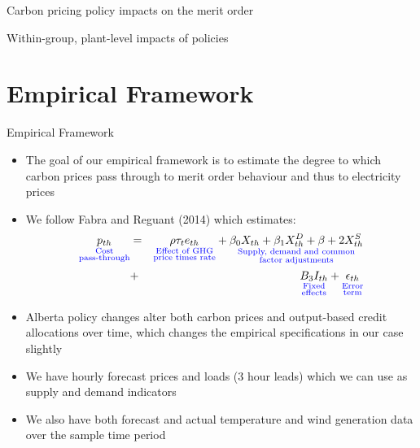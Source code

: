 \documentclass{beamer}
\renewcommand{\(}{\begin{columns}}
\renewcommand{\)}{\end{columns}}
\newcommand{\<}[1]{\begin{column}{#1}}
\renewcommand{\>}{\end{column}}
\begin{document}
\begin{frame}{Carbon pricing policy impacts on the merit order}
   \vfill
\end{frame}


\begin{frame}{Within-group, plant-level impacts of policies}
   \vfill
\end{frame}


\section{Empirical Framework}
\begin{frame}{Empirical Framework}
    \begin{block}{}
    \begin{itemize}
    \item The goal of our empirical framework is to estimate the degree to which carbon prices pass through to merit order behaviour and thus to electricity prices
    \item We follow Fabra and Reguant (2014) which estimates:
    \begin{eqnarray*}\label{eq:production}
    \underset{\color{blue}\substack{\text{Cost}\\{\text{pass-through}}}} {p_{th}} &=&\underset{\color{blue}\substack{\text{Effect of GHG}\\{\text{price times rate}}}} {\rho\tau_te_{th}}
    +\underset{\color{blue}\substack{\text{Supply, demand and common}\\{\text{factor adjustments}}}} {\beta_0X_{th}+\beta_1X_{th}^D+\beta+2X_{th}^S}\\&+&
    \underset{\color{blue}\substack{\text{Fixed}\\{\text{effects}}}}{B_3I_{th}}
    + \underset{\color{blue}\substack{\text{Error}\\{\text{term}}}}{\epsilon_{th}}
    \end{eqnarray*}
    \item Alberta policy changes alter both carbon prices and output-based credit allocations over time, which changes the empirical specifications in our case slightly
    \item We have hourly forecast prices and loads (3 hour leads) which we can use as supply and demand indicators
    \item We also have both forecast and actual temperature and wind generation data over the sample time period
    \end{itemize}
  \end{block}
   \vfill
\end{frame}
\end{document}
